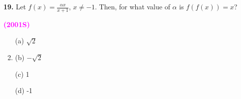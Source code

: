 \documentclass[journal,12pt,twocolumn]{IEEEtran}
\theoremstyle{remark}
\begin{document}
\textbf{19.} Let $f(x)=\frac{\alpha x}{x+1}$, $x\neq-1$. Then, for what value of $\alpha$ is $f(f(x))=x$?

\hfill{\textcolor{magenta}{\textbf{(2001S)}}}

\begin{multicols}{4}
	\begin{enumerate}
		\item[(a)] $\sqrt{2}$ 
		\item(b) $-\sqrt{2}$ 
		\item[(c)] 1 
		\item[(d)] -1
	\end{enumerate}
\end{multicols}
\end{document}
